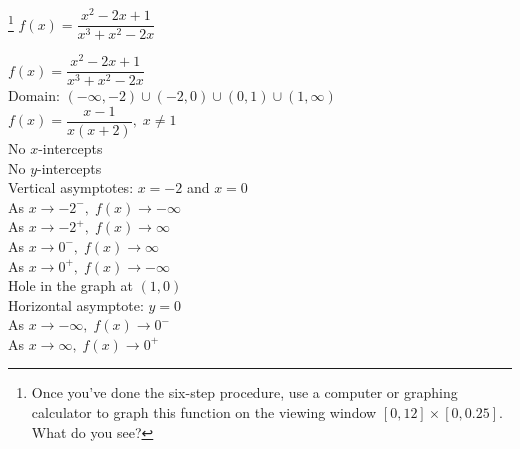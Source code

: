 {\footnote{Once you've done the six-step procedure, use a computer or graphing calculator to graph this function on the viewing window $[0, 12] \times [0, 0.25]$.  What do you see?} $f(x) = \dfrac{x^{2} - 2x + 1}{x^{3} + x^{2} - 2x}$ }
{$f(x) = \dfrac{x^{2} - 2x + 1}{x^{3} + x^{2} - 2x}$\\
Domain: $(-\infty, -2) \cup (-2, 0) \cup (0, 1) \cup (1, \infty)$\\
$f(x) = \dfrac{x - 1}{x(x + 2)}, \; x \neq 1$\\
No $x$-intercepts\\
No $y$-intercepts\\
Vertical asymptotes: $x = -2$ and $x = 0$\\
As $x \rightarrow -2^{-}, \; f(x) \rightarrow -\infty$\\
As $x \rightarrow -2^{+}, \; f(x) \rightarrow \infty$\\
As $x \rightarrow 0^{-}, \; f(x) \rightarrow \infty$\\
As $x \rightarrow 0^{+}, \; f(x) \rightarrow -\infty$\\
Hole in the graph at $(1, 0)$\\
Horizontal asymptote: $y = 0$\\
As $x \rightarrow -\infty, \; f(x) \rightarrow 0^{-}$\\
As $x \rightarrow \infty, \; f(x) \rightarrow 0^{+}$


\begin{center}
\end{center}}
